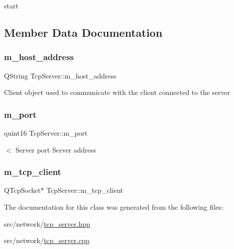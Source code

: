 start 



\subsection{Member Data Documentation}
\mbox{\label{class_tcp_server_aa8fd2e3eebacb69a7f785ffcc2a69eee}} 
\subsubsection{\texorpdfstring{m\_host\_address}{m\_host\_address}}
{\footnotesize\ttfamily Q\+String Tcp\+Server\+::m\+\_\+host\+\_\+address\hspace{0.3cm}{\ttfamily [private]}}

Client object used to communicate with the client connected to the server \mbox{\label{class_tcp_server_a01d5a7bfe29ae6632180be7899d3740f}} 
\subsubsection{\texorpdfstring{m\_port}{m\_port}}
{\footnotesize\ttfamily quint16 Tcp\+Server\+::m\+\_\+port\hspace{0.3cm}{\ttfamily [private]}}

$<$ Server port Server address \mbox{\label{class_tcp_server_a34a159e3301900eac7bf08346fc3615b}} 
\subsubsection{\texorpdfstring{m\_tcp\_client}{m\_tcp\_client}}
{\footnotesize\ttfamily Q\+Tcp\+Socket$\ast$ Tcp\+Server\+::m\+\_\+tcp\+\_\+client\hspace{0.3cm}{\ttfamily [private]}}



The documentation for this class was generated from the following files\+:\begin{DoxyCompactItemize}
\item 
src/network/\mbox{\hyperlink{tcp__server_8hpp}{tcp\+\_\+server.\+hpp}}\item 
src/network/\mbox{\hyperlink{tcp__server_8cpp}{tcp\+\_\+server.\+cpp}}\end{DoxyCompactItemize}
